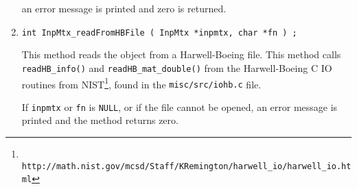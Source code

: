 \begin{enumerate}
an error message is printed and zero is returned.
\item
\begin{verbatim}
int InpMtx_readFromHBFile ( InpMtx *inpmtx, char *fn ) ;
\end{verbatim}
\par
This method reads the object from a Harwell-Boeing file.
This method calls {\tt readHB\_info()} and
{\tt readHB\_mat\_double()} from the Harwell-Boeing C IO routines
from NIST\footnote{\tt
http://math.nist.gov/mcsd/Staff/KRemington/harwell\_io/harwell\_io.html},
found in the {\tt misc/src/iohb.c} file.
\par {}
If {\tt inpmtx} or {\tt fn} is {\tt NULL},
or if the file cannot be opened,
an error message is printed and the method returns zero.
\end{enumerate}
